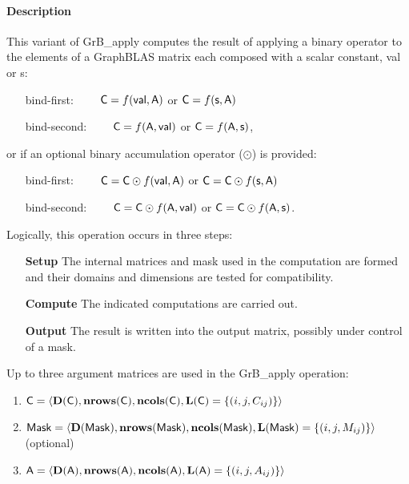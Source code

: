 \paragraph{Description}

{\color{red}
This variant of {\sf GrB\_apply} computes the result of applying a binary operator
to the elements of a GraphBLAS matrix each composed with a scalar constant, {\sf val} or {\sf s}:   
\begin{itemize}[leftmargin=2.1in]
\item[bind-first:~~~~]  ${\sf C} = f({\sf val}, {\sf A})$ or ${\sf C} = f({\sf s}, {\sf A})$
\item[bind-second:~~~~] ${\sf C} = f({\sf A}, {\sf val})$ or ${\sf C} = f({\sf A}, {\sf s})$,
\end{itemize}
or if an optional binary accumulation operator ($\odot$) is provided:  
\begin{itemize}[leftmargin=2.1in]
\item[bind-first:~~~~]  ${\sf C} = {\sf C} \odot f({\sf val}, {\sf A})$ or ${\sf C} = {\sf C} \odot f({\sf s}, {\sf A})$
\item[bind-second:~~~~] ${\sf C} = {\sf C} \odot f({\sf A}, {\sf val})$ or ${\sf C} = {\sf C} \odot f({\sf A}, {\sf s})$.  
\end{itemize}
}

Logically, this operation occurs in three steps:
\begin{enumerate}[leftmargin=0.85in]
\item[\bf Setup] The internal matrices and mask used in the computation are formed 
and their domains and dimensions are tested for compatibility.
\item[\bf Compute] The indicated computations are carried out.
\item[\bf Output] The result is written into the output matrix, possibly under 
control of a mask.
\end{enumerate}

Up to three argument matrices are used in the {\sf GrB\_apply} operation:
\begin{enumerate}
	\item ${\sf C} = \langle \bold{D}({\sf C}),\bold{nrows}({\sf C}),
    \bold{ncols}({\sf C}),\bold{L}({\sf C}) = \{(i,j,C_{ij}) \} \rangle$

	\item ${\sf Mask} = \langle \bold{D}({\sf Mask}),\bold{nrows}({\sf Mask}),
    \bold{ncols}({\sf Mask}),\bold{L}({\sf Mask}) = \{(i,j,M_{ij}) \} \rangle$ (optional)

	\item ${\sf A} = \langle \bold{D}({\sf A}),\bold{nrows}({\sf A}),
    \bold{ncols}({\sf A}),\bold{L}({\sf A}) = \{(i,j,A_{ij}) \} \rangle$
\end{enumerate}

